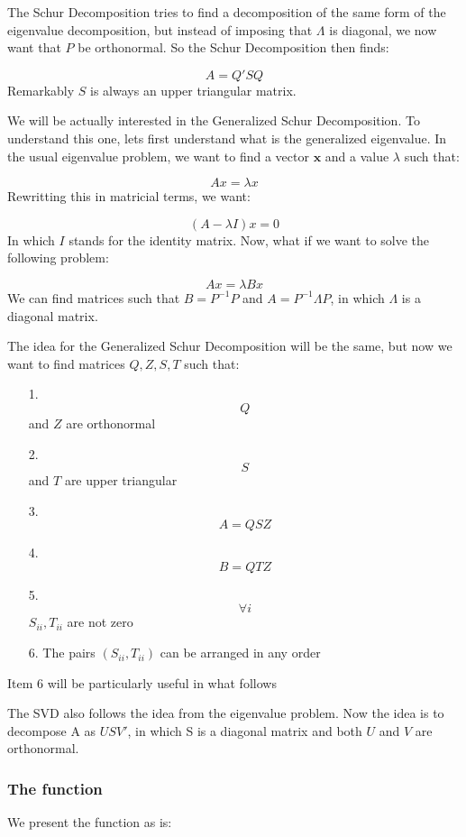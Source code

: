 \documentclass[12pt,a4paper]{article}
\begin{document}
The Schur Decomposition tries to find a decomposition	of the same form of the eigenvalue decomposition, but instead of imposing that $\Lambda$ is diagonal, we now want that $P$ be orthonormal. So the Schur Decomposition then finds:

\[
A = Q'SQ
\]
Remarkably $S$ is always an upper triangular matrix.

We will be actually interested in the Generalized Schur Decomposition. To understand this one, lets first understand what is the generalized eigenvalue. In the usual eigenvalue problem, we want to find a vector $\mathbf{x}$ and a value $\lambda$ such that:

\[
Ax = \lambda x
\]
Rewritting this in matricial terms, we want:

\[
(A - \lambda I)x = 0
\]
In which $I$ stands for the identity matrix. Now, what if we want to solve the following problem:

\[
Ax = \lambda{}Bx
\]
We can find matrices such that $B = P^{-1}P$ and $A = P^{-1}\Lambda{}P$, in which $\Lambda$ is a diagonal matrix.

The idea for the Generalized Schur Decomposition will be the same, but now we want to find matrices $Q,Z,S,T$ such that:

\begin{itemize}
\item[1. ] \[
Q
\]
and $Z$ are orthonormal


\item[2. ] \[
S
\]
and $T$ are upper triangular


\item[3. ] \[
A = QSZ
\]

\item[4. ] \[
B = QTZ
\]

\item[5. ] \[
\forall i
\]
$S_{ii}, T_{ii}$ are not zero


\item[6. ] The pairs $(S_{ii}, T_{ii})$ can be arranged in any order

\end{itemize}
Item 6 will be particularly useful in what follows

The SVD also follows the idea from the eigenvalue problem. Now the idea is to decompose A as $USV'$, in which S is a diagonal matrix and both $U$ and $V$ are orthonormal.

\subsubsection{The function}
We present the function as is:
\end{document}

